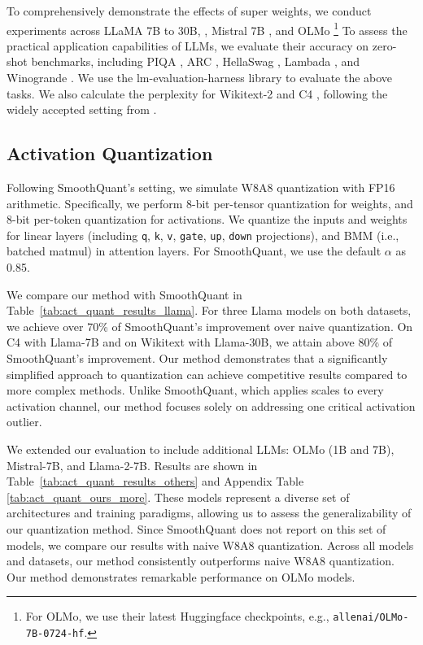 \documentclass{article} %
\begin{document}
To comprehensively demonstrate the effects of super weights, we conduct experiments across LLaMA 7B to 30B, \citep{touvron2023llamaopenefficientfoundation}, Mistral 7B \citep{jiang2023mistral7b}, and OLMo \citep{groeneveld2024olmo} \footnote{For OLMo, we use their latest Huggingface checkpoints, e.g., \texttt{allenai/OLMo-7B-0724-hf}.}  To assess the practical application capabilities of LLMs, we evaluate their accuracy on zero-shot benchmarks, including PIQA \citep{bisk2020piqa}, ARC \citep{clark2018thinksolvedquestionanswering}, HellaSwag \citep{zellers-etal-2019-hellaswag}, Lambada \citep{paperno-etal-2016-lambada}, and Winogrande \citep{10.1145/3474381}.  We use the lm-evaluation-harness \citep{eval-harness} library to evaluate the above tasks. We also calculate the perplexity for Wikitext-2 \citep{merity2017pointer} and C4 \citep{c4}, following the widely accepted setting from \citep{frantar-gptq}.


\subsection{Activation Quantization}
Following SmoothQuant's setting, we simulate W8A8 quantization with FP16 arithmetic. Specifically, we perform 8-bit per-tensor quantization for weights, and 8-bit per-token quantization for activations. We quantize the inputs and weights for linear layers (including \texttt{q}, \texttt{k}, \texttt{v}, \texttt{gate}, \texttt{up}, \texttt{down} projections), and BMM (i.e., batched matmul) in attention layers. For SmoothQuant, we use the default  $\alpha $ as 0.85.  


We compare our method with SmoothQuant in Table~\ref{tab:act_quant_results_llama}. For three Llama models on both datasets, we achieve over 70\% of SmoothQuant's improvement over naive quantization. On C4 with Llama-7B and on Wikitext with Llama-30B, we attain above 80\% of SmoothQuant's improvement. Our method demonstrates that a significantly simplified approach to quantization can achieve competitive results compared to more complex methods. Unlike SmoothQuant, which applies scales to every activation channel, our method focuses solely on addressing one critical activation outlier. 


We extended our evaluation to include additional LLMs: OLMo (1B and 7B), Mistral-7B, and Llama-2-7B. Results are shown in Table~\ref{tab:act_quant_results_others} and Appendix Table \ref{tab:act_quant_ours_more}. These models represent a diverse set of architectures and training paradigms, allowing us to assess the generalizability of our quantization method. Since SmoothQuant does not report on this set of models, we compare our results with naive W8A8 quantization. Across all models and datasets, our method consistently outperforms naive W8A8 quantization.  
Our method demonstrates remarkable performance on OLMo models. 
\end{document}
